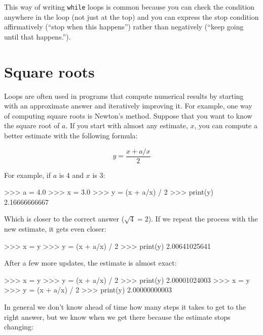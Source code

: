 This way of writing {\tt while} loops is common because you
can check the condition anywhere in the loop (not just at the
top) and you can express the stop condition affirmatively
(``stop when this happens'') rather than negatively (``keep going
until that happens.'').


\section{Square roots}


Loops are often used in programs that compute
numerical results by starting with an approximate answer and
iteratively improving it.
%
%
For example, one way of computing square roots is Newton's method.
Suppose that you want to know the square root of $a$.  If you start
with almost any estimate, $x$, you can compute a better
estimate with the following formula:

\begin{center}
\begin{equation}
y = \frac{x + a/x}{2} 
\label{eq:sqrt}
\end{equation}
\end{center}

%
For example, if $a$ is 4 and $x$ is 3:

\beforeverb
\begin{pyinterpreter}
>>> a = 4.0
>>> x = 3.0
>>> y = (x + a/x) / 2
>>> print(y)
2.16666666667
\end{pyinterpreter}
\afterverb
%
Which is closer to the correct answer ($\sqrt{4} = 2$).  If we
repeat the process with the new estimate, it gets even closer:

\beforeverb
\begin{pyinterpreter}
>>> x = y
>>> y = (x + a/x) / 2
>>> print(y)
2.00641025641
\end{pyinterpreter}
\afterverb
%
After a few more updates, the estimate is almost exact:


\beforeverb
\begin{pyinterpreter}
>>> x = y
>>> y = (x + a/x) / 2
>>> print(y)
2.00001024003
>>> x = y
>>> y = (x + a/x) / 2
>>> print(y)
2.00000000003
\end{pyinterpreter}
\afterverb
%
In general we don't know ahead of time how many steps it takes
to get to the right answer, but we know when we get there
because the estimate
stops changing:

